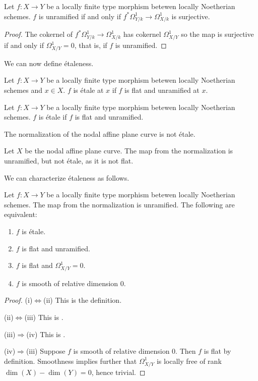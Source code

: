 \begin{lemma}\label{lem: unramified implies surjective differentials}
    Let $f:X\to Y$ be a locally finite type morphism betewen locally Noetherian schemes. $f$ is unramified if and only if $f^{*}\Omega_{Y/k}^{1}\to\Omega^{1}_{X/k}$ is surjective. 
\end{lemma}
\begin{proof}
    The cokernel of $f^{*}\Omega_{Y/k}^{1}\to\Omega^{1}_{X/k}$ has cokernel $\Omega^{1}_{X/Y}$ so the map is surjective if and only if $\Omega^{1}_{X/Y}=0$, that is, if $f$ is unramified. 
\end{proof}
We can now define \'{e}taleness. 
\begin{definition}\label{def: etale at point}
    Let $f:X\to Y$ be a locally finite type morphism betewen locally Noetherian schemes and $x\in X$. $f$ is \'{e}tale at $x$ if $f$ is flat and unramified at $x$. 
\end{definition}
\begin{definition}\label{def: etale morphism}
    Let $f:X\to Y$ be a locally finite type morphism betewen locally Noetherian schemes. $f$ is \'{e}tale if $f$ is flat and unramified. 
\end{definition}
The normalization of the nodal affine plane curve is not \'{e}tale. 
\begin{example}
    Let $X$ be the nodal affine plane curve. The map from the normalization is unramified, but not \'{e}tale, as it is not flat. 
\end{example}
We can characterize \'{e}taleness as follows. 
\begin{proposition}\label{prop: tfae etale}
    Let $f:X\to Y$ be a locally finite type morphism betewen locally Noetherian schemes. The map from the normalization is unramified. The following are equivalent:
    \begin{enumerate}[label=(\alph*)]
        \item $f$ is \'{e}tale. 
        \item $f$ is flat and unramified. 
        \item $f$ is flat and $\Omega^{1}_{X/Y}=0$. 
        \item $f$ is smooth of relative dimension 0. 
    \end{enumerate}
\end{proposition}
\begin{proof}
    (i)$\Leftrightarrow$(ii) This is the definition. 

    (ii)$\Leftrightarrow$(iii) This is . 

    (iii)$\Rightarrow$(iv) This is .

    (iv)$\Rightarrow$(iii) Suppose $f$ is smooth of relative dimension 0. Then $f$ is flat by definition. Smoothness implies further that $\Omega^{1}_{X/Y}$ is locally free of rank $\dim(X)-\dim(Y)=0$, hence trivial. 
\end{proof}
